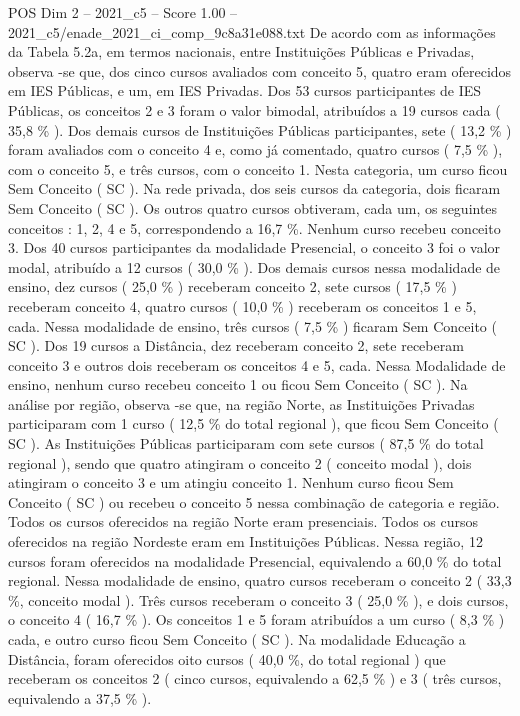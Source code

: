 \begin{textsample}{POS Dim 2 – 2021\_c5 – Score 1.00 – 2021\_c5/enade\_2021\_ci\_comp\_9c8a31e088.txt}
De acordo com as informações da Tabela 5.2a, em termos nacionais, entre Instituições Públicas e Privadas, observa -se que, dos cinco cursos avaliados com conceito 5, quatro eram oferecidos em IES Públicas, e um, em IES Privadas.
Dos 53 cursos participantes de IES Públicas, os conceitos 2 e 3 foram o valor bimodal, atribuídos a 19 cursos cada ( 35,8 \% ).
Dos demais cursos de Instituições Públicas participantes, sete ( 13,2 \% ) foram avaliados com o conceito 4 e, como já comentado, quatro cursos ( 7,5 \% ), com o conceito 5, e três cursos, com o conceito 1.
Nesta categoria, um curso ficou Sem Conceito ( SC ).
Na rede privada, dos seis cursos da categoria, dois ficaram Sem Conceito ( SC ).
Os outros quatro cursos obtiveram, cada um, os seguintes conceitos : 1, 2, 4 e 5, correspondendo a 16,7 \%.
Nenhum curso recebeu conceito 3.
Dos 40 cursos participantes da modalidade Presencial, o conceito 3 foi o valor modal, atribuído a 12 cursos ( 30,0 \% ).
Dos demais cursos nessa modalidade de ensino, dez cursos ( 25,0 \% ) receberam conceito 2, sete cursos ( 17,5 \% ) receberam conceito 4, quatro cursos ( 10,0 \% ) receberam os conceitos 1 e 5, cada.
Nessa modalidade de ensino, três cursos ( 7,5 \% ) ficaram Sem Conceito ( SC ).
Dos 19 cursos a Distância, dez receberam conceito 2, sete receberam conceito 3 e outros dois receberam os conceitos 4 e 5, cada.
Nessa Modalidade de ensino, nenhum curso recebeu conceito 1 ou ficou Sem Conceito ( SC ).
Na análise por região, observa -se que, na região Norte, as Instituições Privadas participaram com 1 curso ( 12,5 \% do total regional ), que ficou Sem Conceito ( SC ).
As Instituições Públicas participaram com sete cursos ( 87,5 \% do total regional ), sendo que quatro atingiram o conceito 2 ( conceito modal ), dois atingiram o conceito 3 e um atingiu conceito 1.
Nenhum curso ficou Sem Conceito ( SC ) ou recebeu o conceito 5 nessa combinação de categoria e região.
Todos os cursos oferecidos na região Norte eram presenciais.
Todos os cursos oferecidos na região Nordeste eram em Instituições Públicas.
Nessa região, 12 cursos foram oferecidos na modalidade Presencial, equivalendo a 60,0 \% do total regional.
Nessa modalidade de ensino, quatro cursos receberam o conceito 2 ( 33,3 \%, conceito modal ).
Três cursos receberam o conceito 3 ( 25,0 \% ), e dois cursos, o conceito 4 ( 16,7 \% ).
Os conceitos 1 e 5 foram atribuídos a um curso ( 8,3 \% ) cada, e outro curso ficou Sem Conceito ( SC ).
Na modalidade Educação a Distância, foram oferecidos oito cursos ( 40,0 \%, do total regional ) que receberam os conceitos 2 ( cinco cursos, equivalendo a 62,5 \% ) e 3 ( três cursos, equivalendo a 37,5 \% ).

\end{textsample}
